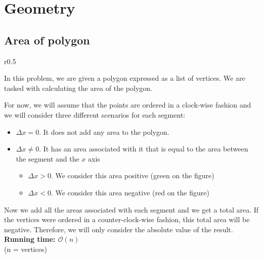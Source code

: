\chapter{Geometry}

\section{Area of polygon}

\begin{wrapfigure}{r}{0.5\linewidth}
	\centering
	\vspace*{-40 pt}
\end{wrapfigure}

In this problem, we are given a polygon expressed as a list of vertices.
We are tasked with calculating the area of the polygon.

For now, we will assume that the points are ordered in a clock-wise fashion
and we will consider three different scenarios for each segment:
\begin{itemize}
	\item $\Delta x=0$. It does not add any area to the polygon.
	\item $\Delta x\ne 0$. It has an area associated with it that is equal
		to the area between the segment and the $x$ axis
		\begin{itemize}
			\item $\Delta x > 0$. We consider this area positive
				(green on the figure)
			\item $\Delta x < 0$. We consider this area negative
				(red on the figure)
		\end{itemize}
\end{itemize}

Now we add all the areas associated with each segment and we get a total area.
If the vertices were ordered in a counter-clock-wise fashion, this total
area will be negative. Therefore, we will only consider the absolute
value of the result.
\noindent \textbf{\boldmath Running time: $\mathcal{O}(n)$}
\\ {\small (n = vertices)}



